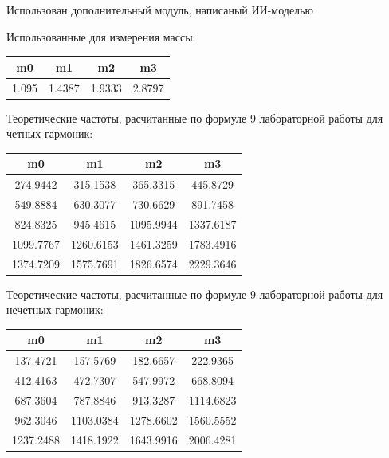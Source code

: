 \par\noindent Использован дополнительный модуль, написаный ИИ-моделью\par\vspace{4mm}
\par\noindent Использованные для измерения массы:\par\vspace{4mm}
\par
\begin{center}
\begin{tabular}{cccc}
\toprule
m0 & m1 & m2 & m3 \\
\midrule
1.095 & 1.4387 & 1.9333 & 2.8797 \\
\bottomrule
\end{tabular}
\end{center}

\par\noindent Теоретические частоты, расчитанные по формуле 9 лабораторной работы 
 для четных гармоник:\par\vspace{4mm}
\par
\begin{center}
\begin{tabular}{cccc}
\toprule
m0 & m1 & m2 & m3 \\
\midrule
274.9442 & 315.1538 & 365.3315 & 445.8729 \\
549.8884 & 630.3077 & 730.6629 & 891.7458 \\
824.8325 & 945.4615 & 1095.9944 & 1337.6187 \\
1099.7767 & 1260.6153 & 1461.3259 & 1783.4916 \\
1374.7209 & 1575.7691 & 1826.6574 & 2229.3646 \\
\bottomrule
\end{tabular}
\end{center}

\par\noindent Теоретические частоты, расчитанные по формуле 9 лабораторной работы 
 для нечетных гармоник:\par\vspace{4mm}
\par
\begin{center}
\begin{tabular}{cccc}
\toprule
m0 & m1 & m2 & m3 \\
\midrule
137.4721 & 157.5769 & 182.6657 & 222.9365 \\
412.4163 & 472.7307 & 547.9972 & 668.8094 \\
687.3604 & 787.8846 & 913.3287 & 1114.6823 \\
962.3046 & 1103.0384 & 1278.6602 & 1560.5552 \\
1237.2488 & 1418.1922 & 1643.9916 & 2006.4281 \\
\bottomrule
\end{tabular}
\end{center}

